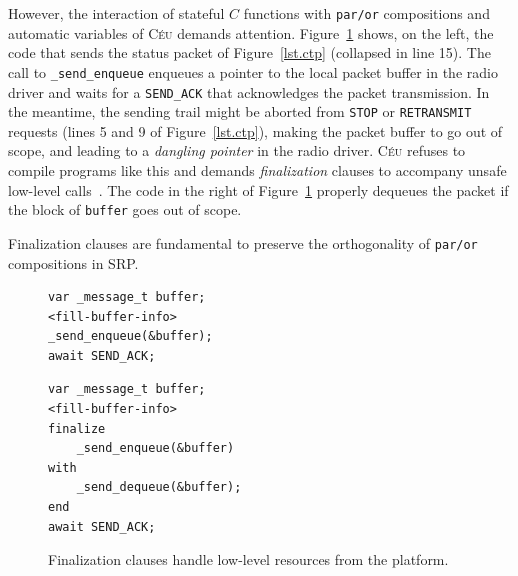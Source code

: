 \documentclass{acm_proc_article-sp}
\newcommand{\CEU}{\textsc{C\'{e}u}\xspace}
\newcommand{\code}[1] {{\small{\texttt{#1}}}}
\newcommand{\1}{\;}
\newcommand{\2}{\;\;}
\newcommand{\3}{\;\;\;}
\newcommand{\5}{\;\;\;\;\;}
\begin{document}

%
However, the interaction of stateful $C$ functions with \code{par/or} 
compositions and automatic variables of \CEU demands attention.
%
Figure~\ref{lst.fin} shows, on the left, the code that sends the status packet 
of Figure~\ref{lst.ctp} (collapsed in line 15).
%
The call to \code{\_send\_enqueue} enqueues a pointer to the local packet 
buffer in the radio driver and waits for a \code{SEND\_ACK} that acknowledges
the packet transmission.
%
In the meantime, the sending trail might be aborted from \code{STOP} or 
\code{RETRANSMIT} requests (lines 5 and 9 of Figure~\ref{lst.ctp}), making the 
packet buffer to go out of scope, and leading to a \emph{dangling pointer} in 
the radio driver.
%
\CEU refuses to compile programs like this and demands \emph{finalization} 
clauses to accompany unsafe low-level calls~\cite{ceu.sensys13}.
The code in the right of Figure~\ref{lst.fin} properly dequeues the packet if
the block of \code{buffer} goes out of scope.

Finalization clauses are fundamental to preserve the orthogonality of 
\code{par/or} compositions in SRP.

\begin{figure}[t]
\begin{minipage}[t]{0.45\linewidth}
\begin{lstlisting}
var _message_t buffer;
<fill-buffer-info>
_send_enqueue(&buffer);
await SEND_ACK;
\end{lstlisting}
\end{minipage}
%
\begin{minipage}[t]{0.50\linewidth}
\begin{lstlisting}
var _message_t buffer;
<fill-buffer-info>
finalize
    _send_enqueue(&buffer)
with
    _send_dequeue(&buffer);
end
await SEND_ACK;
\end{lstlisting}
\end{minipage}
\caption{ Finalization clauses handle low-level resources from the platform.
\label{lst.fin}
}
\end{figure}

\end{document}
